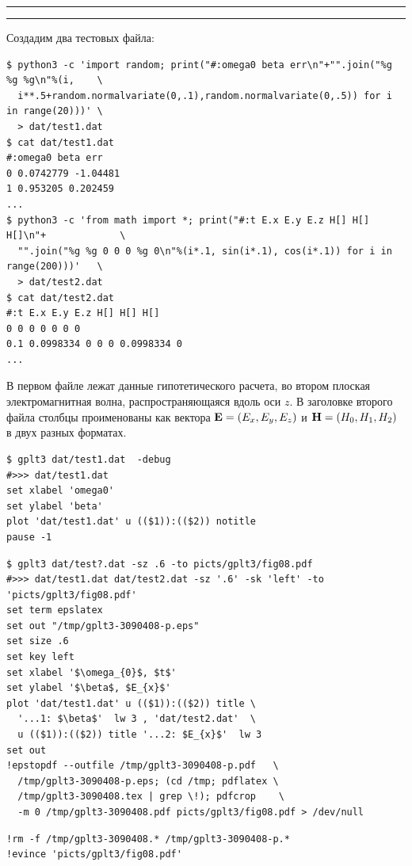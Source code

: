 \documentclass[12pt]{article}
\begin{document}
\noindent\rule{.45\textwidth}{1pt}\hfill {}  \hfill\rule{.45\textwidth}{1pt}

\vspace{3mm}
Создадим два тестовых файла:
{\small
\begin{verbatim}
$ python3 -c 'import random; print("#:omega0 beta err\n"+"".join("%g %g %g\n"%(i,    \
  i**.5+random.normalvariate(0,.1),random.normalvariate(0,.5)) for i in range(20)))' \
  > dat/test1.dat
$ cat dat/test1.dat
#:omega0 beta err
0 0.0742779 -1.04481
1 0.953205 0.202459
...
$ python3 -c 'from math import *; print("#:t E.x E.y E.z H[] H[] H[]\n"+             \
  "".join("%g %g 0 0 0 %g 0\n"%(i*.1, sin(i*.1), cos(i*.1)) for i in range(200)))'   \
  > dat/test2.dat
$ cat dat/test2.dat
#:t E.x E.y E.z H[] H[] H[]
0 0 0 0 0 0 0
0.1 0.0998334 0 0 0 0.0998334 0
...
\end{verbatim}
}
В первом файле лежат данные гипотетического расчета, во втором плоская электромагнитная волна, распространяющаяся
вдоль оси $z$. В заголовке второго файла столбцы проименованы как вектора ${\bf E}=(E_x, E_y, E_z)$ и ${\bf H}=(H_0, H_1, H_2)$ в двух разных форматах.\\

\noindent
\begin{minipage}[b]{.69\textwidth}
  \small
\begin{verbatim}
$ gplt3 dat/test1.dat  -debug
#>>> dat/test1.dat
set xlabel 'omega0'
set ylabel 'beta'
plot 'dat/test1.dat' u (($1)):(($2)) notitle   
pause -1
\end{verbatim}
\end{minipage}
\begin{minipage}[b]{.54\textwidth}
  \small
\begin{verbatim}
$ gplt3 dat/test?.dat -sz .6 -to picts/gplt3/fig08.pdf
#>>> dat/test1.dat dat/test2.dat -sz '.6' -sk 'left' -to 'picts/gplt3/fig08.pdf'
set term epslatex 
set out "/tmp/gplt3-3090408-p.eps"
set size .6
set key left
set xlabel '$\omega_{0}$, $t$'
set ylabel '$\beta$, $E_{x}$'
plot 'dat/test1.dat' u (($1)):(($2)) title \
  '...1: $\beta$'  lw 3 , 'dat/test2.dat'  \
  u (($1)):(($2)) title '...2: $E_{x}$'  lw 3 
set out
!epstopdf --outfile /tmp/gplt3-3090408-p.pdf   \
  /tmp/gplt3-3090408-p.eps; (cd /tmp; pdflatex \
  /tmp/gplt3-3090408.tex | grep \!); pdfcrop    \
  -m 0 /tmp/gplt3-3090408.pdf picts/gplt3/fig08.pdf > /dev/null
\end{verbatim}
\end{minipage}
\begin{verbatim}
!rm -f /tmp/gplt3-3090408.* /tmp/gplt3-3090408-p.*
!evince 'picts/gplt3/fig08.pdf'
\end{verbatim}
\end{document}
